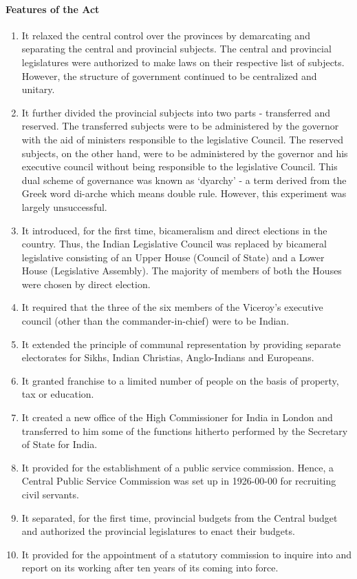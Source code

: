 \begin{multicols}{2}
\paragraph{Features of the Act}
\begin{enumerate}
  \item It relaxed the central control over the provinces by demarcating and separating the central and provincial subjects. The central and provincial legislatures were authorized to make laws on their respective list of subjects. However, the structure of government continued to be
  centralized and unitary.
  \item It further divided the provincial subjects into two parts - transferred and reserved. The transferred subjects were to be administered by the governor with the aid of ministers responsible to the legislative Council. The reserved subjects, on the other hand, were to be administered by the governor and his executive council without being responsible to the legislative Council. This dual scheme of governance was known as
   `dyarchy' - a term derived from the Greek word di-arche which means double rule. However, this experiment was largely unsuccessful.
  \item It introduced, for the first time, bicameralism and direct elections in the country. Thus, the Indian Legislative Council was replaced by bicameral legislative consisting of an Upper House (Council of State) and a Lower House (Legislative Assembly). The majority of members of both the Houses were chosen by direct election.
  \item It required that the three of the six members of the Viceroy's executive council (other than the commander-in-chief) were to be Indian.
  \item It extended the principle of communal representation by providing separate electorates for Sikhs, Indian Christias, Anglo-Indians and Europeans.
  \item It granted franchise to a limited number of people on the basis of property, tax or education.
  \item It created a new office of the High Commissioner for India in London and transferred to him some of the functions hitherto performed by the Secretary of State for India.
  \item It provided for the establishment of a public service commission. Hence, a Central Public Service Commission was set up in 1926-00-00 for recruiting civil servants\endnote.
  \item It separated, for the first time, provincial budgets from the Central budget and authorized the provincial legislatures to enact their budgets.
  \item It provided for the appointment of a statutory commission to inquire into and report on its working after ten years of its coming into force.
\end{enumerate}


\end{multicols}
